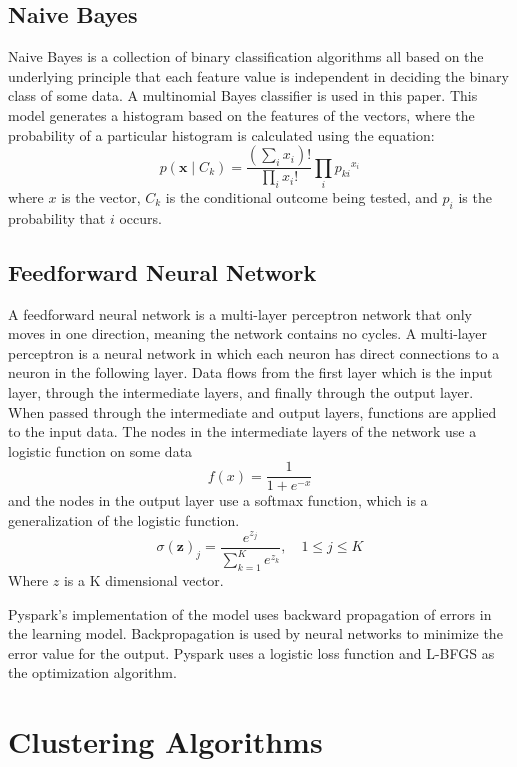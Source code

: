 \documentclass[9pt,twocolumn,twoside]{idsi}
\begin{document}
\subsection{Naive Bayes}
Naive Bayes is a collection of binary classification algorithms all based on the underlying principle that each feature value is independent in deciding the binary class of some data. A multinomial Bayes classifier is used in this paper. This model generates a histogram based on the features of the vectors, where the probability of a particular histogram is calculated using the equation:
\begin{equation}
{\displaystyle p(\mathbf {x} \mid C_{k})={\frac {(\sum _{i}x_{i})!}{\prod _{i}x_{i}!}}\prod _{i}{p_{ki}}^{x_{i}}}
\end{equation}
where $x$ is the vector, $C_{k}$ is the conditional outcome being tested, and $p_{i}$ is the probability that $i$ occurs.
\subsection{Feedforward Neural Network}
A feedforward neural network is a multi-layer perceptron network that only moves in one direction, meaning the network contains no cycles. A multi-layer perceptron is a neural network in which each neuron has direct connections to a neuron in the following layer. Data  flows from the first layer which is the input layer, through the intermediate layers, and finally through the output layer. When passed through the intermediate and output layers, functions are applied to the input data. The nodes in the intermediate layers of the network use a logistic function on some data 
\begin{equation}
{\displaystyle f(x)={\frac {1}{1+e^{-x}}}}
\end{equation}
and the nodes in the output layer use a softmax function, which is a generalization of the logistic function.
\begin{equation}
\sigma (\mathbf {z} )_{j}={\frac {e^{z_{j}}}{\sum _{k=1}^{K}e^{z_{k}}}}, \quad 1\leq j \leq K
\end{equation}
Where $z$ is a K dimensional vector.

Pyspark's implementation of the model uses backward propagation of errors in the learning model. Backpropagation is used by neural networks to minimize the error value for the output. Pyspark uses a logistic loss function and L-BFGS as the optimization algorithm.
\section{Clustering Algorithms}
\end{document}
